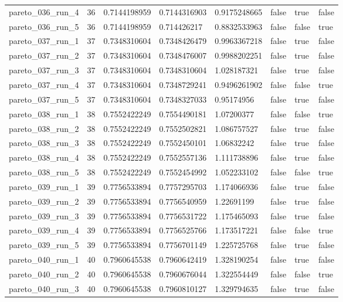\begin{tabular}{@{}llllllll@{}}
pareto\_036\_run\_4 & 36 & 0.7144198959 & 0.7144316903 & 0.9175248665 & false & true & false \\
pareto\_036\_run\_5 & 36 & 0.7144198959 & 0.714426217 & 0.8832533963 & false & false & true \\
pareto\_037\_run\_1 & 37 & 0.7348310604 & 0.7348426479 & 0.9963367218 & false & true & false \\
pareto\_037\_run\_2 & 37 & 0.7348310604 & 0.7348476007 & 0.9988202251 & false & true & false \\
pareto\_037\_run\_3 & 37 & 0.7348310604 & 0.7348310604 & 1.028187321 & false & true & false \\
pareto\_037\_run\_4 & 37 & 0.7348310604 & 0.7348729241 & 0.9496261902 & false & false & true \\
pareto\_037\_run\_5 & 37 & 0.7348310604 & 0.7348327033 & 0.95174956 & false & true & false \\
pareto\_038\_run\_1 & 38 & 0.7552422249 & 0.7554490181 & 1.07200377 & false & false & true \\
pareto\_038\_run\_2 & 38 & 0.7552422249 & 0.7552502821 & 1.086757527 & false & true & false \\
pareto\_038\_run\_3 & 38 & 0.7552422249 & 0.7552450101 & 1.06832242 & false & true & false \\
pareto\_038\_run\_4 & 38 & 0.7552422249 & 0.7552557136 & 1.111738896 & false & true & false \\
pareto\_038\_run\_5 & 38 & 0.7552422249 & 0.7552454992 & 1.052233102 & false & false & true \\
pareto\_039\_run\_1 & 39 & 0.7756533894 & 0.7757295703 & 1.174066936 & false & true & false \\
pareto\_039\_run\_2 & 39 & 0.7756533894 & 0.7756540959 & 1.22691199 & false & true & false \\
pareto\_039\_run\_3 & 39 & 0.7756533894 & 0.7756531722 & 1.175465093 & false & true & false \\
pareto\_039\_run\_4 & 39 & 0.7756533894 & 0.7756525766 & 1.173517221 & false & false & true \\
pareto\_039\_run\_5 & 39 & 0.7756533894 & 0.7756701149 & 1.225725768 & false & true & false \\
pareto\_040\_run\_1 & 40 & 0.7960645538 & 0.7960642419 & 1.328190254 & false & true & false \\
pareto\_040\_run\_2 & 40 & 0.7960645538 & 0.7960676044 & 1.322554449 & false & false & true \\
pareto\_040\_run\_3 & 40 & 0.7960645538 & 0.7960810127 & 1.329794635 & false & true & false \\

\end{tabular}
